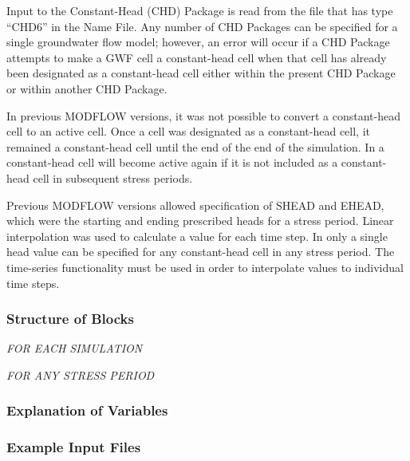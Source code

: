 
Input to the Constant-Head (CHD) Package is read from the file that has type ``CHD6'' in the Name File.  Any number of CHD Packages can be specified for a single groundwater flow model; however, an error will occur if a CHD Package attempts to make a GWF cell a constant-head cell when that cell has already been designated as a constant-head cell either within the present CHD Package or within another CHD Package.

In previous MODFLOW versions, it was not possible to convert a constant-head cell to an active cell.  Once a cell was designated as a constant-head cell, it remained a constant-head cell until the end of the end of the simulation.  In \mf a constant-head cell will become active again if it is not included as a constant-head cell in subsequent stress periods.

Previous MODFLOW versions allowed specification of SHEAD and EHEAD, which were the starting and ending prescribed heads for a stress period.  Linear interpolation was used to calculate a value for each time step.  In \mf only a single head value can be specified for any constant-head cell in any stress period.  The time-series functionality must be used in order to interpolate values to individual time steps.  

\vspace{5mm}
\subsubsection{Structure of Blocks}
\vspace{5mm}

\noindent \textit{FOR EACH SIMULATION}


\vspace{5mm}
\noindent \textit{FOR ANY STRESS PERIOD}

\packageperioddescription

\vspace{5mm}
\subsubsection{Explanation of Variables}
\begin{description}

\end{description}

\vspace{5mm}
\subsubsection{Example Input Files}


